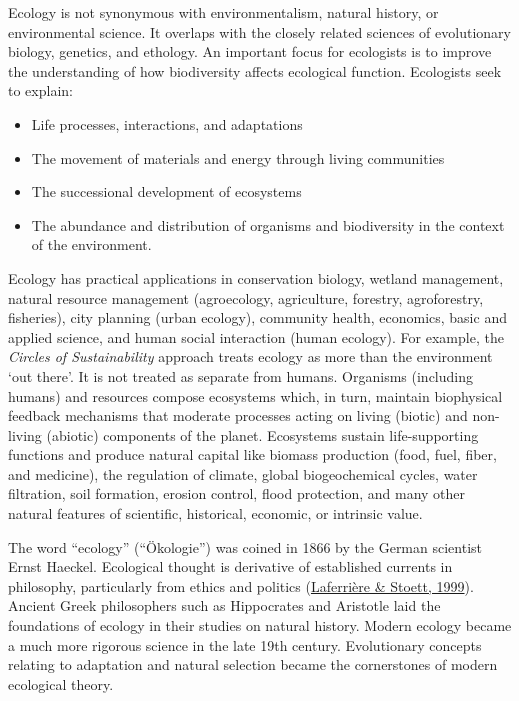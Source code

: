 \documentclass[twoside]{extreport}
\begin{document}
Ecology is not synonymous with environmentalism, natural history, or
environmental science. It overlaps with the closely related sciences of
evolutionary biology, genetics, and ethology. An important focus for
ecologists is to improve the understanding of how biodiversity affects
ecological function. Ecologists seek to explain:

\begin{itemize}
\tightlist
\item
  Life processes, interactions, and adaptations
\item
  The movement of materials and energy through living communities
\item
  The successional development of ecosystems
\item
  The abundance and distribution of organisms and biodiversity in the
  context of the environment.
\end{itemize}

Ecology has practical applications in conservation biology, wetland
management, natural resource management (agroecology, agriculture,
forestry, agroforestry, fisheries), city planning (urban ecology),
community health, economics, basic and applied science, and human social
interaction (human ecology). For example, the \emph{Circles of
Sustainability} approach treats ecology as more than the environment
`out there'. It is not treated as separate from humans. Organisms
(including humans) and resources compose ecosystems which, in turn,
maintain biophysical feedback mechanisms that moderate processes acting
on living (biotic) and non-living (abiotic) components of the planet.
Ecosystems sustain life-supporting functions and produce natural capital
like biomass production (food, fuel, fiber, and medicine), the
regulation of climate, global biogeochemical cycles, water filtration,
soil formation, erosion control, flood protection, and many other
natural features of scientific, historical, economic, or intrinsic
value.

The word ``ecology'' (``Ökologie'') was coined in 1866 by the German
scientist Ernst Haeckel. Ecological thought is derivative of established
currents in philosophy, particularly from ethics and politics
(\protect\hyperlink{ref-LaferriereStoett1999}{Laferrière \& Stoett,
1999}). Ancient Greek philosophers such as Hippocrates and Aristotle
laid the foundations of ecology in their studies on natural history.
Modern ecology became a much more rigorous science in the late 19th
century. Evolutionary concepts relating to adaptation and natural
selection became the cornerstones of modern ecological theory.
\end{document}

